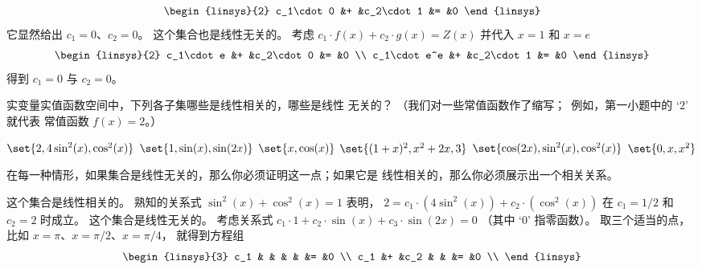 \begin{exercises}
\begin{answer}
\begin{exparts}
\begin{equation*}
\begin{linsys}{2}
              c_1\cdot 0     &+  &c_2\cdot 1     &=  &0
            \end{linsys}
          \end{equation*}
          它显然给出 \( c_1=0 \)、\( c_2=0 \)。
        \partsitem 这个集合也是线性无关的。
          考虑 \( c_1\cdot f(x)+c_2\cdot g(x)=Z(x) \)
          并代入 \( x=1 \) 和 \( x=e \)
          \begin{equation*}
            \begin{linsys}{2}
              c_1\cdot e    &+  &c_2\cdot 0     &=  &0  \\
              c_1\cdot e^e  &+  &c_2\cdot 1     &=  &0
            \end{linsys}
          \end{equation*}
          得到 \( c_1=0 \) 与 \( c_2=0 \)。
      \end{exparts}
     \end{answer}
  \recommended \item
    实变量实值函数空间中，下列各子集哪些是线性相关的，哪些是线性
    无关的？
    （我们对一些常值函数作了缩写；~例如，第一小题中的 `$2$' 就代表
     常值函数 $f(x)=2$。）
    \begin{exparts*}
      \partsitem \( \set{2,4\sin^2(x),\cos^2(x)} \)
      \partsitem \( \set{1,\sin(x),\sin(2x)} \)
      \partsitem \( \set{x,\cos(x)} \)
      \partsitem \( \set{(1+x)^2,x^2+2x,3} \)
      \partsitem \( \set{\cos(2x),\sin^2(x),\cos^2(x)} \)
      \partsitem \( \set{0,x,x^2} \)
    \end{exparts*}
    \begin{answer}
      在每一种情形，如果集合是线性无关的，那么你必须证明这一点；如果它是
      线性相关的，那么你必须展示出一个相关关系。
      \begin{exparts}
        \partsitem 这个集合是线性相关的。
          熟知的关系式 $\sin^2(x)+\cos^2(x)=1$ 表明，
          $2=c_1\cdot(4\sin^2(x))+c_2\cdot(\cos^2(x))$ 在
          $c_1=1/2$ 和 $c_2=2$ 时成立。
        \partsitem 这个集合是线性无关的。
          考虑关系式
          $c_1\cdot 1+c_2\cdot\sin(x)+c_3\cdot\sin(2x)=0$
          （其中 `$0$' 指零函数）。
          取三个适当的点，比如 $x=\pi$、$x=\pi/2$、$x=\pi/4$，
          就得到方程组
          \begin{equation*}
            \begin{linsys}{3}
               c_1  &   &                &   &      &=  &0  \\
               c_1  &+  &c_2             &   &      &=  &0  \\

\end{linsys}
\end{equation*}
\end{exparts}
\end{answer}
\end{exercises}
